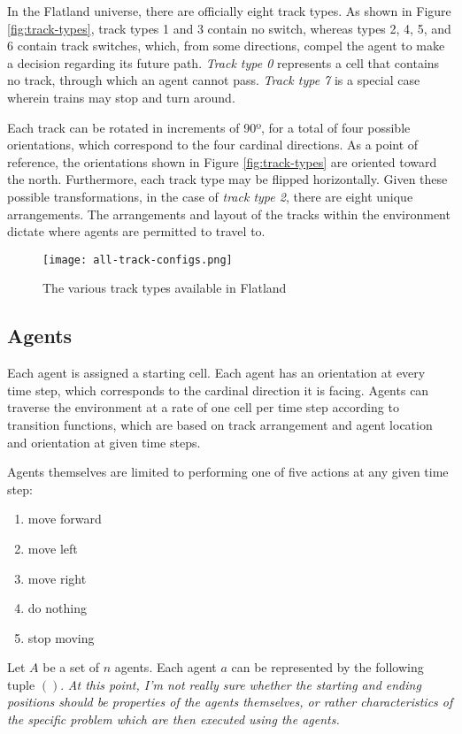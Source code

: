 \documentclass{article}
\begin{document}
In the Flatland universe, there are officially eight track types. As shown in Figure \ref{fig:track-types}, track types 1 and 3 contain no switch, whereas types 2, 4, 5, and 6 contain track switches, which, from some directions, compel the agent to make a decision regarding its future path. \textit{Track type 0} represents a cell that contains no track, through which an agent cannot pass. \textit{Track type 7} is a special case wherein trains may stop and turn around. 

Each track can be rotated in increments of 90º, for a total of four possible orientations, which correspond to the four cardinal directions. As a point of reference, the orientations shown in Figure \ref{fig:track-types} are oriented toward the north. Furthermore, each track type may be flipped horizontally. Given these possible transformations, in the case of \textit{track type 2}, there are eight unique arrangements. The arrangements and layout of the tracks within the environment dictate where agents are permitted to travel to.

\begin{figure}[h]
    \caption{The various track types available in Flatland}
    \centering
    \texttt{[image: all-track-configs.png]}
    \label{fig:all-track-confis}
\end{figure}


\subsection{Agents}
 Each agent is assigned a starting cell.  Each agent has an orientation at every time step, which corresponds to the cardinal direction it is facing.  Agents can traverse the environment at a rate of one cell per time step according to transition functions, which are based on track arrangement and agent location and orientation at given time steps.  \medskip

 Agents themselves are limited to performing one of five actions at any given time step:
\begin{enumerate}
\itemsep0em 
    \item move forward
    \item move left
    \item move right
    \item do nothing
    \item stop moving
\end{enumerate}

 Let $A$ be a set of $n$ agents.  Each agent $a$ can be represented by the following tuple $()$. \textit{At this point, I'm not really sure whether the starting and ending positions should be properties of the agents themselves, or rather characteristics of the specific problem which are then executed using the agents.}  \medskip
\end{document}
